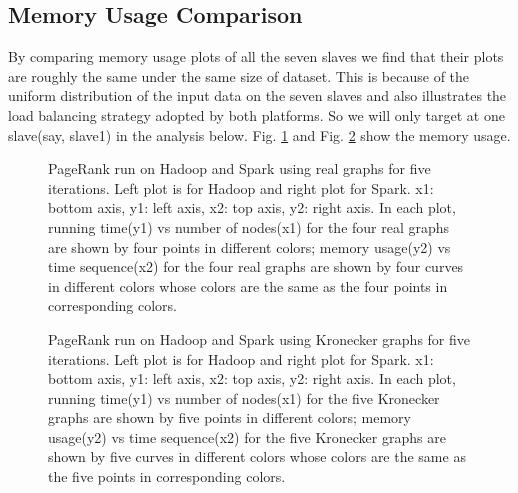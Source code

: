 \documentclass[12pt,conference,letterpaper]{IEEEtran}
\begin{document}
\subsection{Memory Usage Comparison}

 By comparing memory usage plots of all the seven slaves we find that their plots  are roughly the same under the same size of dataset. This is because of the uniform distribution of the input data on the seven slaves and also illustrates the load balancing strategy adopted by both platforms. So we will only target at one slave(say, slave1) in the analysis below. Fig. \ref{fig:time_memory_real} and Fig. \ref{fig:time_memory_syn} show the memory usage.

 
\begin{figure}[!t]
  \centering
  \caption{PageRank run on Hadoop and Spark using real graphs for five iterations. Left plot is for Hadoop and right plot for Spark. x1: bottom axis, y1: left axis, x2: top axis, y2: right axis. In each plot, running time(y1) vs number of nodes(x1) for the four real graphs are shown by four points in different colors; memory usage(y2) vs time sequence(x2) for the four real graphs are shown by four curves in different colors whose colors are the same as the four points in corresponding colors.}
  \label{fig:time_memory_real} 
\end{figure}

\begin{figure}[!t]
  \centering
  \caption{PageRank run on Hadoop and Spark using Kronecker graphs for five iterations. Left plot is for Hadoop and right plot for Spark. x1: bottom axis, y1: left axis, x2: top axis, y2: right axis. In each plot, running time(y1) vs number of nodes(x1) for the five Kronecker graphs are shown by five points in different colors; memory usage(y2) vs time sequence(x2) for the five Kronecker graphs are shown by five curves in different colors whose colors are the same as the five points in corresponding colors.}
  \label{fig:time_memory_syn} 
\end{figure}
\end{document}

